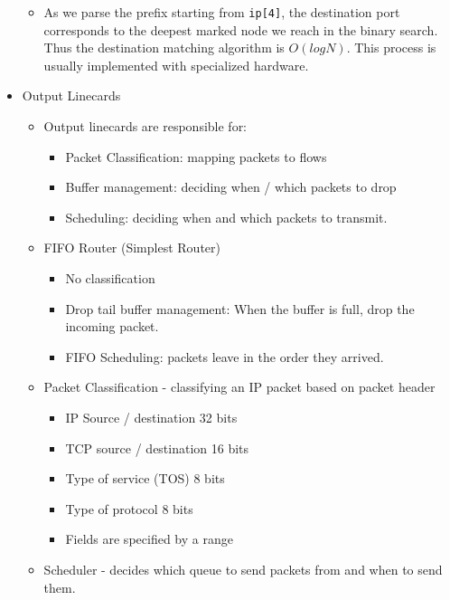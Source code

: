 \documentclass[]{article}
\providecommand{\tightlist}{%
  \setlength{\itemsep}{0pt}\setlength{\parskip}{0pt}}
\begin{document}
\begin{itemize}
  \begin{itemize}
  \tightlist
  \item
    As we parse the prefix starting from \texttt{ip{[}4{]}}, the
    destination port corresponds to the deepest marked node we reach in
    the binary search. Thus the destination matching algorithm is
    \(O(logN)\). This process is usually implemented with specialized
    hardware.
  \end{itemize}
\item
  Output Linecards

  \begin{itemize}
  \tightlist
  \item
    Output linecards are responsible for:

    \begin{itemize}
    \tightlist
    \item
      Packet Classification: mapping packets to flows
    \item
      Buffer management: deciding when / which packets to drop
    \item
      Scheduling: deciding when and which packets to transmit.
    \end{itemize}
  \item
    FIFO Router (Simplest Router)

    \begin{itemize}
    \tightlist
    \item
      No classification
    \item
      Drop tail buffer management: When the buffer is full, drop the
      incoming packet.
    \item
      FIFO Scheduling: packets leave in the order they arrived.
    \end{itemize}
  \item
    Packet Classification - classifying an IP packet based on packet
    header

    \begin{itemize}
    \tightlist
    \item
      IP Source / destination 32 bits
    \item
      TCP source / destination 16 bits
    \item
      Type of service (TOS) 8 bits
    \item
      Type of protocol 8 bits
    \item
      Fields are specified by a range
    \end{itemize}
  \item
    Scheduler - decides which queue to send packets from and when to
    send them.


\end{itemize}
\end{itemize}
\end{document}

